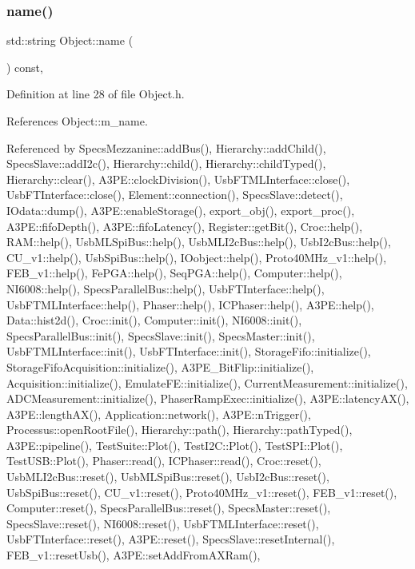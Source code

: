 \subsubsection{\texorpdfstring{name()}{name()}}
{\footnotesize\ttfamily std\+::string Object\+::name (\begin{DoxyParamCaption}{ }\end{DoxyParamCaption}) const\hspace{0.3cm}{\ttfamily [inline]}, {\ttfamily [inherited]}}



Definition at line 28 of file Object.\+h.



References Object\+::m\+\_\+name.



Referenced by Specs\+Mezzanine\+::add\+Bus(), Hierarchy\+::add\+Child(), Specs\+Slave\+::add\+I2c(), Hierarchy\+::child(), Hierarchy\+::child\+Typed(), Hierarchy\+::clear(), A3\+P\+E\+::clock\+Division(), Usb\+F\+T\+M\+L\+Interface\+::close(), Usb\+F\+T\+Interface\+::close(), Element\+::connection(), Specs\+Slave\+::detect(), I\+Odata\+::dump(), A3\+P\+E\+::enable\+Storage(), export\+\_\+obj(), export\+\_\+proc(), A3\+P\+E\+::fifo\+Depth(), A3\+P\+E\+::fifo\+Latency(), Register\+::get\+Bit(), Croc\+::help(), R\+A\+M\+::help(), Usb\+M\+L\+Spi\+Bus\+::help(), Usb\+M\+L\+I2c\+Bus\+::help(), Usb\+I2c\+Bus\+::help(), C\+U\+\_\+v1\+::help(), Usb\+Spi\+Bus\+::help(), I\+Oobject\+::help(), Proto40\+M\+Hz\+\_\+v1\+::help(), F\+E\+B\+\_\+v1\+::help(), Fe\+P\+G\+A\+::help(), Seq\+P\+G\+A\+::help(), Computer\+::help(), N\+I6008\+::help(), Specs\+Parallel\+Bus\+::help(), Usb\+F\+T\+Interface\+::help(), Usb\+F\+T\+M\+L\+Interface\+::help(), Phaser\+::help(), I\+C\+Phaser\+::help(), A3\+P\+E\+::help(), Data\+::hist2d(), Croc\+::init(), Computer\+::init(), N\+I6008\+::init(), Specs\+Parallel\+Bus\+::init(), Specs\+Slave\+::init(), Specs\+Master\+::init(), Usb\+F\+T\+M\+L\+Interface\+::init(), Usb\+F\+T\+Interface\+::init(), Storage\+Fifo\+::initialize(), Storage\+Fifo\+Acquisition\+::initialize(), A3\+P\+E\+\_\+\+Bit\+Flip\+::initialize(), Acquisition\+::initialize(), Emulate\+F\+E\+::initialize(), Current\+Measurement\+::initialize(), A\+D\+C\+Measurement\+::initialize(), Phaser\+Ramp\+Exec\+::initialize(), A3\+P\+E\+::latency\+A\+X(), A3\+P\+E\+::length\+A\+X(), Application\+::network(), A3\+P\+E\+::n\+Trigger(), Processus\+::open\+Root\+File(), Hierarchy\+::path(), Hierarchy\+::path\+Typed(), A3\+P\+E\+::pipeline(), Test\+Suite\+::\+Plot(), Test\+I2\+C\+::\+Plot(), Test\+S\+P\+I\+::\+Plot(), Test\+U\+S\+B\+::\+Plot(), Phaser\+::read(), I\+C\+Phaser\+::read(), Croc\+::reset(), Usb\+M\+L\+I2c\+Bus\+::reset(), Usb\+M\+L\+Spi\+Bus\+::reset(), Usb\+I2c\+Bus\+::reset(), Usb\+Spi\+Bus\+::reset(), C\+U\+\_\+v1\+::reset(), Proto40\+M\+Hz\+\_\+v1\+::reset(), F\+E\+B\+\_\+v1\+::reset(), Computer\+::reset(), Specs\+Parallel\+Bus\+::reset(), Specs\+Master\+::reset(), Specs\+Slave\+::reset(), N\+I6008\+::reset(), Usb\+F\+T\+M\+L\+Interface\+::reset(), Usb\+F\+T\+Interface\+::reset(), A3\+P\+E\+::reset(), Specs\+Slave\+::reset\+Internal(), F\+E\+B\+\_\+v1\+::reset\+Usb(), A3\+P\+E\+::set\+Add\+From\+A\+X\+Ram(), 